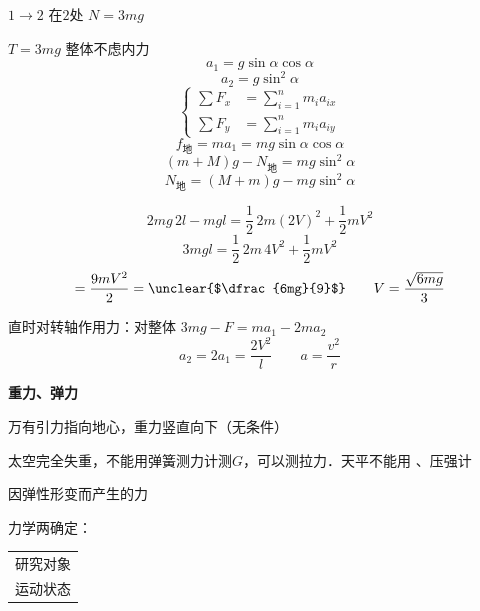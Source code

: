 $1\to2$ 在$2$处 $N=3mg$\par
$T=3mg$
整体不虑内力
\[ a_1=g\sin\alpha\cos\alpha \] %
\[ a_2=g\sin^2\alpha \]
\[ \left\{\begin{aligned} \sum F_x&=\sum_{i=1}^{n}m_ia_{ix}\\ \sum F_y&=\sum_{i=1}^{n}m_ia_{iy} \end{aligned}\right. \]
\[ f_{\text{地}}=ma_1=mg\sin\alpha\cos\alpha \]
\[ (m+M)g-N_{\text{地}}=mg\sin^2\alpha \]
\[ N_{\text{地}}=(M+m)g-mg\sin^2\alpha \] %
\begin{problem}
\begin{solution}
\[ 2mg\,2l-mgl=\frac{1}{2}\,2m(2V)^2+\frac{1}{2}mV^2 \]
\[ 3mgl=\frac{1}{2}\,2m\,4V^2+\frac{1}{2}mV^2 \]
\[ =\frac{9mV^2}{2}=\text{\unclear{$\dfrac{6mg}{9}$}}\qquad V=\frac{\sqrt{6mg}}{3} \] %
\par\smallskip
{}直时对转轴作用力：对整体 $3mg-F=ma_1-2ma_2$
\[ a_2=2a_1=\frac{2V^2}{l} \qquad a=\frac{v^2}{r} \]
\end{solution}
\end{problem}
\textbf{重力、弹力}\par
万有引力指向地心，重力竖直向下（无条件）\par
太空完全失重，不能用弹簧测力计测$G$，可以测拉力．天平不能用 、压强计\par
{}因弹性形变而产生的力\par
力学两确定：\begin{tabular}[t]{@{}l@{}}研究对象\\运动状态\end{tabular}
